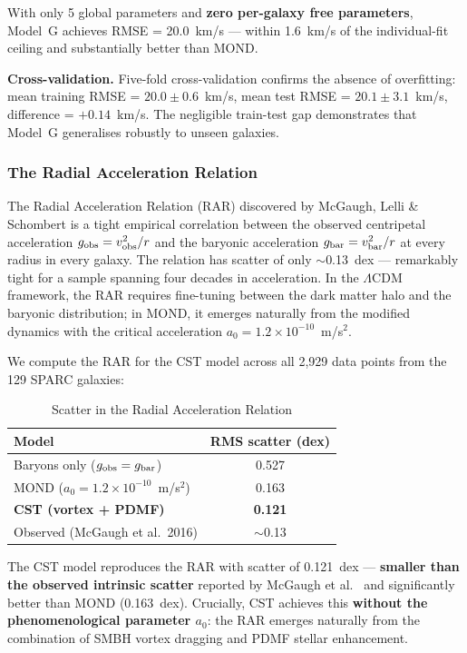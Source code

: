 \documentclass[10pt,a4paper]{article}
\begin{document}
With only 5 global parameters and \textbf{zero per-galaxy free parameters}, Model~G achieves RMSE = 20.0~km/s --- within 1.6~km/s of the individual-fit ceiling and substantially better than MOND.

\textbf{Cross-validation.} Five-fold cross-validation confirms the absence of overfitting: mean training RMSE = $20.0 \pm 0.6$~km/s, mean test RMSE = $20.1 \pm 3.1$~km/s, difference = $+0.14$~km/s. The negligible train-test gap demonstrates that Model~G generalises robustly to unseen galaxies.

\subsubsection{The Radial Acceleration Relation}

The Radial Acceleration Relation (RAR) discovered by McGaugh, Lelli \& Schombert \cite{McGaugh2016} is a tight empirical correlation between the observed centripetal acceleration $g_{\rm obs} = v_{\rm obs}^2/r$ and the baryonic acceleration $g_{\rm bar} = v_{\rm bar}^2/r$ at every radius in every galaxy. The relation has scatter of only $\sim$0.13~dex --- remarkably tight for a sample spanning four decades in acceleration. In the $\Lambda$CDM framework, the RAR requires fine-tuning between the dark matter halo and the baryonic distribution; in MOND, it emerges naturally from the modified dynamics with the critical acceleration $a_0 = 1.2 \times 10^{-10}$~m/s$^2$.

We compute the RAR for the CST model across all 2{,}929 data points from the 129 SPARC galaxies:

\begin{table}[h]
\centering
\caption{Scatter in the Radial Acceleration Relation}
\begin{tabular}{lc}
\toprule
Model & RMS scatter (dex) \\
\midrule
Baryons only ($g_{\rm obs} = g_{\rm bar}$) & 0.527 \\
MOND ($a_0 = 1.2 \times 10^{-10}$~m/s$^2$) & 0.163 \\
\textbf{CST (vortex + PDMF)} & \textbf{0.121} \\
Observed (McGaugh et al.\ 2016) & $\sim$0.13 \\
\bottomrule
\end{tabular}
\end{table}

The CST model reproduces the RAR with scatter of 0.121~dex --- \textbf{smaller than the observed intrinsic scatter} reported by McGaugh et al.\ \cite{McGaugh2016} and significantly better than MOND (0.163~dex). Crucially, CST achieves this \textbf{without the phenomenological parameter $a_0$}: the RAR emerges naturally from the combination of SMBH vortex dragging and PDMF stellar enhancement.
\end{document}
